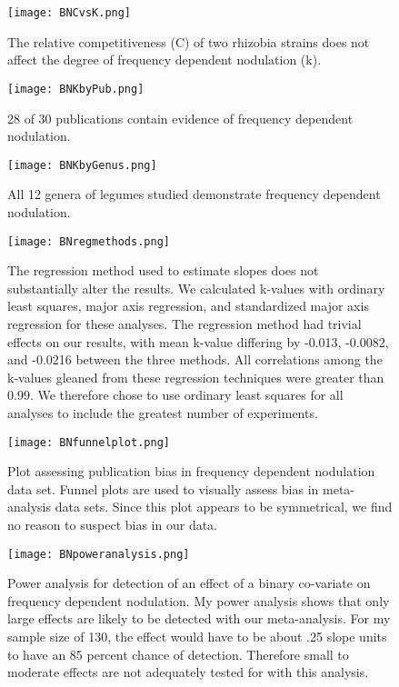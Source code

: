\documentclass[12pt]{article}
\begin{document}
\begin{doublespace}
	\begin{figure}[H]
		\texttt{[image: BNCvsK.png]}
		\caption{The relative competitiveness (C) of two rhizobia strains
			does not affect the degree of frequency dependent nodulation (k).	
		}
		\label{fig:CvsK}
	\end{figure}
	
	\begin{figure}[H]
		\texttt{[image: BNKbyPub.png]}
		\caption{28 of 30 publications contain evidence of frequency dependent nodulation.	
		}
		\label{fig:KbyPub}
	\end{figure}
	
	\begin{figure}[H]
		\texttt{[image: BNKbyGenus.png]}
		\caption{All 12 genera of legumes studied demonstrate frequency dependent nodulation.	
		}
		\label{fig:KbyGenus}
	\end{figure}
	
	\begin{figure}[H]
		\texttt{[image: BNregmethods.png]}
		\caption{The regression method used to estimate slopes does not substantially alter the results. We calculated k-values with ordinary least squares, major axis regression, and standardized major axis regression for these analyses. The regression method had trivial effects on our results, with mean k-value differing by -0.013,  -0.0082, and -0.0216 between the three methods. All correlations among the k-values gleaned from these regression techniques were greater than 0.99.  We therefore chose to use ordinary least squares for all analyses to include the greatest number of experiments.
		}
		\label{fig:regmethods}
	\end{figure}
	
	\begin{figure}[H]
		\texttt{[image: BNfunnelplot.png]}
		\caption{Plot assessing publication bias in frequency dependent nodulation data set. Funnel plots are used to visually assess bias in meta-analysis data sets. Since this plot appears to be symmetrical, we find no reason to suspect bias in our data.}
		\label{fig:funnel}
	\end{figure}

	\begin{figure}[H]
		\texttt{[image: BNpoweranalysis.png]}
		\caption{Power analysis for detection of an effect of a binary co-variate on frequency dependent nodulation. My power analysis shows that only large effects are likely to be detected with our meta-analysis. For my sample size of 130, the effect would have to be about .25 slope units to have an 85 percent chance of detection. Therefore small to moderate effects are not adequately tested for with this analysis.}
		\label{fig:power}
	\end{figure}



\end{doublespace}
\end{document}
